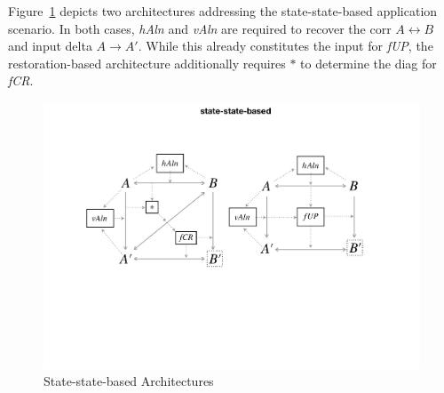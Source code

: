 Figure~\ref{fig:stateStateBased} depicts two architectures addressing the state-state-based application scenario.
In both cases, \emph{hAln} and \emph{vAln} are required to recover the corr $A \leftrightarrow B$ and input delta $A \rightarrow A'$.
While this already constitutes the input for \emph{fUP}, the restoration-based architecture additionally requires $\ast$ to determine the diag for \emph{fCR}.
%
\begin{figure}[tb!]
	\centering
	\includegraphics[width=\columnwidth]{diagrams/foundations/state-state-based}
	\caption{State-state-based Architectures}
	\label{fig:stateStateBased}
\end{figure}

